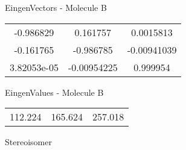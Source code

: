 \begin{multicols}{2}
\begin{center}
\vtab
 EingenVectors - Molecule B     \\
\vtab
\begin{tabular}{|c c c|}
-0.986829	 & 	0.161757	 & 	0.0015813	 \\
-0.161765	 & 	-0.986785	 & 	-0.00941039	 \\
3.82053e-05	 & 	-0.00954225	 & 	0.999954
\end{tabular}

\vtab
 EingenValues - Molecule B     \\
\vtab
\begin{tabular}{|c c c|}
112.224	 & 	165.624	 & 	257.018	 \\
\end{tabular}

\end{center}
\end{multicols}
\begin{center}
\vtab
\vtab
\textcolor{NavyBlue}{\Large Stereoisomer}
\end{center}

 \newpage

